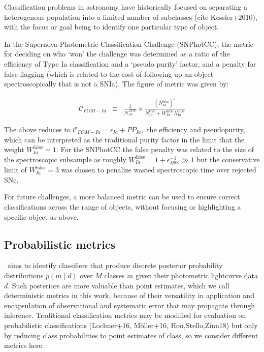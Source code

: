 Classification problems in astronomy have historically focused on separating a heterogenous population into a limited number of subclasses (cite Kessler+2010), with the focus or goal being to identify one particular type of object.

In the Supernova Photometric Classification Challenge (SNPhotCC), the metric for deciding on who `won' the challenge was determined as a ratio of the efficiency of Type Ia classification and a `pseudo purity' factor, and a penalty for false-flagging (which is related to the cost of following up an object spectroscopically that is not a SNIa).
The figure of metric was given by:

\begin{eqnarray}
\mathcal{C}_{FOM-Ia} &\equiv& \frac{1}{\mathcal{N}_{Ia}^{TOT}}\times \frac{(N_{Ia}^{\mathrm{true}})^2}{N_{Ia}^\mathrm{true}+W_{Ia}^\mathrm{false}N_{Ia}^\mathrm{false}}
\end{eqnarray}

The above reduces to $\mathcal{C}_{FOM-Ia}  = \epsilon_{Ia} + PP_{Ia},$ the efficiency and pseudopurity, which can be interpreted as the traditional purity factor in the limit that the weight $W_{Ia}^\mathrm{false} = 1$.
For the SNPhotCC the false penalty was related to the size of the spectroscopic subsample as roughly $W_{Ia}^\mathrm{false} = 1 + \epsilon_{spec}^{-1} \gg 1$ but the conservative limit of $W_{Ia}^\mathrm{false} = 3$ was chosen to penalize wasted spectroscopic time over rejected SNe.

For future challenges, a more balanced metric can be used to ensure correct classifications across the range of objects, without focusing or highlighting a specific object as above.

\subsection{Probabilistic metrics}
\label{sec:metrics}

\plasticc\ aims to identify classifiers that produce discrete posterior probability distributions $p(m \mid d)$ over $M$ classes $m$ given their photometric lightcurve data $d$.
Such posteriors are more valuable than point estimates, which we call deterministic metrics in this work, because of their versatility in application and encapsulation of observational and systematic error that may propagate through inference.
Traditional classification metrics may be modified for evaluation on probabilistic classifications (Lochner+16, M\"{o}ller+16, Hon,Stello,Zinn18) but only by reducing class probabilities to point estimates of class, so we consider different metrics here.

